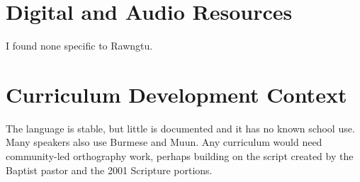 \documentclass[12pt]{article}
\begin{document}
\section{Digital and Audio Resources}
I found none specific to Rawngtu.

\section{Curriculum Development Context}
The language is stable, but little is documented and it has no known school use. Many speakers also use Burmese and Muun. Any curriculum would need community-led orthography work, perhaps building on the script created by the Baptist pastor and the 2001 Scripture portions.
\end{document}
